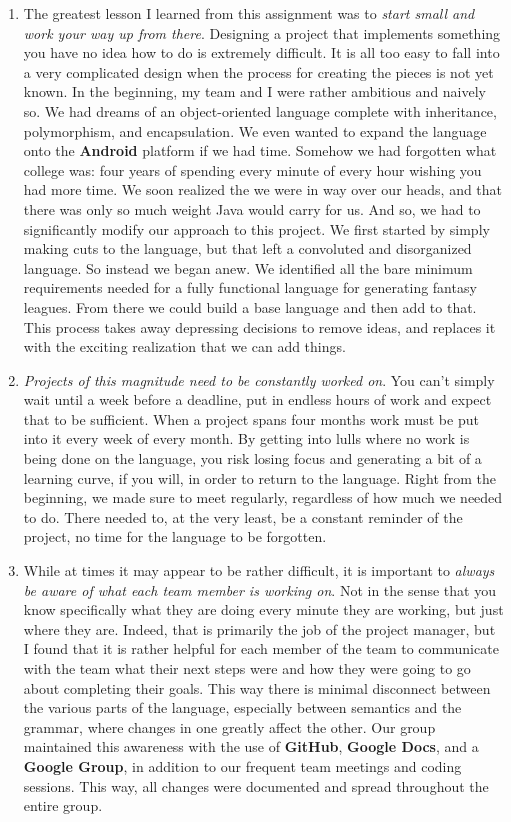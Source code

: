 \documentclass[12pt]{report}
\begin{document}
\begin{enumerate}
\item The greatest lesson I learned from this assignment was to \textit{start small and work your way up from there}. Designing a project that implements something you have no idea how to do is extremely difficult. It is all too easy to fall into a very complicated design when the process for creating the pieces is not yet known. In the beginning, my team and I were rather ambitious and naively so. We had dreams of an object-oriented language complete with inheritance, polymorphism, and encapsulation. We even wanted to expand the language onto the \textbf{Android} platform if we had time. Somehow we had forgotten what college was: four years of spending every minute of every hour wishing you had more time. We soon realized the we were in way over our heads, and that there was only so much weight Java would carry for us. And so, we had to significantly modify our approach to this project. We first started by simply making cuts to the language, but that left a convoluted and disorganized language. So instead we began anew. We identified all the bare minimum requirements needed for a fully functional language for generating fantasy leagues. From there we could build a base language and then add to that. This process takes away depressing decisions to remove ideas, and replaces it with the exciting realization that we can add things.
\item \textit{Projects of this magnitude need to be constantly worked on}. You can't simply wait until a week before a deadline, put in endless hours of work and expect that to be sufficient. When a project spans four months work must be put into it every week of every month. By getting into lulls where no work is being done on the language, you risk losing focus and generating a bit of a learning curve, if you will, in order to return to the language. Right from the beginning, we made sure to meet regularly, regardless of how much we needed to do. There needed to, at the very least, be a constant reminder of the project, no time for the language to be forgotten.
\item While at times it may appear to be rather difficult, it is important to \textit{always be aware of what each team member is working on}. Not in the sense that you know specifically what they are doing every minute they are working, but just where they are. Indeed, that is primarily the job of the project manager, but I found that it is rather helpful for each member of the team to communicate with the team what their next steps were and how they were going to go about completing their goals. This way there is minimal disconnect between the various parts of the language, especially between semantics and the grammar, where changes in one greatly affect the other. Our group maintained this awareness with the use of \textbf{GitHub}, \textbf{Google Docs}, and a \textbf{Google Group}, in addition to our frequent team meetings and coding sessions. This way, all changes were documented and spread throughout the entire group.

\end{enumerate}
\end{document}
